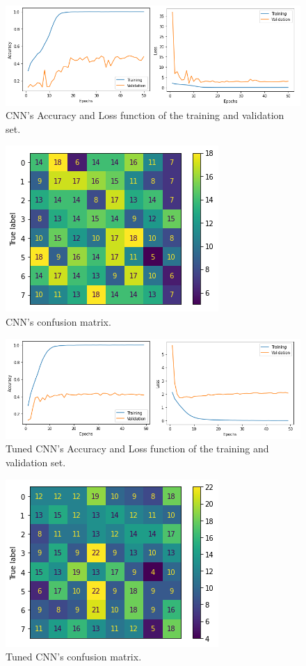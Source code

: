 \begin{figure}[ht]
\centering
\includegraphics[scale=0.6]{images/2021-val-train.png}
\caption{CNN's Accuracy and Loss function of the training and validation set.}
\label{fig:Acc_Loss_2021}
\end{figure}

\begin{figure}[ht]
\centering
\includegraphics[scale=0.6]{images/2021-confusion_matrix.png}
\caption{CNN's confusion matrix.}
\label{fig:cf_2021}
\end{figure}

\begin{figure}[ht]
\centering
\includegraphics[scale=0.6]{images/tuned-val-train.png}
\caption{Tuned CNN's Accuracy and Loss function of the training and validation set.}
\label{fig:Acc_Loss_tuned}
\end{figure}

\begin{figure}[ht]
\centering
\includegraphics[scale=0.6]{images/tuned-confusion_matrix.png}
\caption{Tuned CNN's confusion matrix.}
\label{fig:cf_tuned}
\end{figure}


